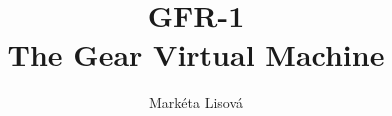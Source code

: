 \documentclass[12pt,a4paper,twoside,titlepage]{book}
\begin{document}
\frontmatter
\title{GFR-1\\ \large The Gear Virtual Machine}
\renewcommand{\docversion}{0.1}
\author{Markéta Lisová}
\maketitle
\clearemptydoublepage
\tableofcontents

\mainmatter
\sloppy



\appendix
\end{document}
